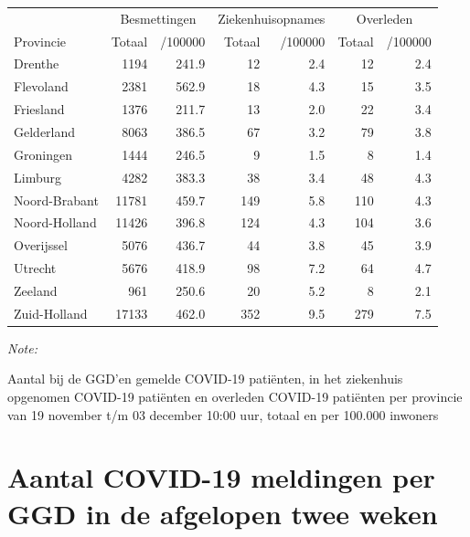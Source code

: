 \documentclass[
  english,
  man,floatsintext]{apa6}
\begin{document}
\begin{table}[H]
\centering
\begin{threeparttable}
\begin{tabular}{lrrrrrr}
\toprule
\multicolumn{1}{c}{ } & \multicolumn{2}{c}{Besmettingen} & \multicolumn{2}{c}{Ziekenhuisopnames} & \multicolumn{2}{c}{Overleden} \\
\cmidrule(l{3pt}r{3pt}){2-3} \cmidrule(l{3pt}r{3pt}){4-5} \cmidrule(l{3pt}r{3pt}){6-7}
Provincie & Totaal & /100000 & Totaal & /100000 & Totaal & /100000\\
\midrule
Drenthe & 1194 & 241.9 & 12 & 2.4 & 12 & 2.4\\
Flevoland & 2381 & 562.9 & 18 & 4.3 & 15 & 3.5\\
Friesland & 1376 & 211.7 & 13 & 2.0 & 22 & 3.4\\
Gelderland & 8063 & 386.5 & 67 & 3.2 & 79 & 3.8\\
Groningen & 1444 & 246.5 & 9 & 1.5 & 8 & 1.4\\
Limburg & 4282 & 383.3 & 38 & 3.4 & 48 & 4.3\\
Noord-Brabant & 11781 & 459.7 & 149 & 5.8 & 110 & 4.3\\
Noord-Holland & 11426 & 396.8 & 124 & 4.3 & 104 & 3.6\\
Overijssel & 5076 & 436.7 & 44 & 3.8 & 45 & 3.9\\
Utrecht & 5676 & 418.9 & 98 & 7.2 & 64 & 4.7\\
Zeeland & 961 & 250.6 & 20 & 5.2 & 8 & 2.1\\
Zuid-Holland & 17133 & 462.0 & 352 & 9.5 & 279 & 7.5\\
\bottomrule
\end{tabular}
\begin{tablenotes}
\item \textit{Note: } 
\item Aantal bij de GGD’en gemelde COVID-19 patiënten, in het ziekenhuis opgenomen COVID-19 patiënten en overleden COVID-19 patiënten per provincie van 19 november t/m 03 december 10:00 uur, totaal en per 100.000 inwoners
\end{tablenotes}
\end{threeparttable}
\end{table}

\newpage

\hypertarget{aantal-covid-19-meldingen-per-ggd-in-de-afgelopen-twee-weken}{%
\section{Aantal COVID-19 meldingen per GGD in de afgelopen twee weken}\label{aantal-covid-19-meldingen-per-ggd-in-de-afgelopen-twee-weken}}
\end{document}
